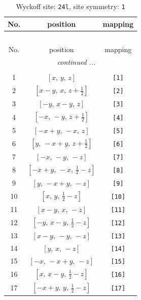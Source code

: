 \documentclass[fleqn,8pt]{jsarticle}
\begin{document}
\begin{longtable}{ccc}
\caption{Wyckoff site: {\tt 24l}, site symmetry: {\tt 1}}
 \\
 \hline \hline
No. & position & mapping \\ \hline \endfirsthead

\multicolumn{2}{l}{\tablename\ \thetable{}} \\
 \hline \hline
No. & position & mapping \\ \hline \endhead

 \hline \hline
\multicolumn{2}{r}{\footnotesize\it continued ...} \\ \endfoot

 \hline \hline
\multicolumn{2}{r}{} \\ \endlastfoot

1 & $\left[ x,\, y,\, z \right]$ & {\tt [1]} \\ \hline
2 & $\left[ x - y,\, x,\, z + \frac{1}{2} \right]$ & {\tt [2]} \\ \hline
3 & $\left[ - y,\, x - y,\, z \right]$ & {\tt [3]} \\ \hline
4 & $\left[ - x,\, - y,\, z + \frac{1}{2} \right]$ & {\tt [4]} \\ \hline
5 & $\left[ - x + y,\, - x,\, z \right]$ & {\tt [5]} \\ \hline
6 & $\left[ y,\, - x + y,\, z + \frac{1}{2} \right]$ & {\tt [6]} \\ \hline
7 & $\left[ - x,\, - y,\, - z \right]$ & {\tt [7]} \\ \hline
8 & $\left[ - x + y,\, - x,\, \frac{1}{2} - z \right]$ & {\tt [8]} \\ \hline
9 & $\left[ y,\, - x + y,\, - z \right]$ & {\tt [9]} \\ \hline
10 & $\left[ x,\, y,\, \frac{1}{2} - z \right]$ & {\tt [10]} \\ \hline
11 & $\left[ x - y,\, x,\, - z \right]$ & {\tt [11]} \\ \hline
12 & $\left[ - y,\, x - y,\, \frac{1}{2} - z \right]$ & {\tt [12]} \\ \hline
13 & $\left[ x - y,\, - y,\, - z \right]$ & {\tt [13]} \\ \hline
14 & $\left[ y,\, x,\, - z \right]$ & {\tt [14]} \\ \hline
15 & $\left[ - x,\, - x + y,\, - z \right]$ & {\tt [15]} \\ \hline
16 & $\left[ x,\, x - y,\, \frac{1}{2} - z \right]$ & {\tt [16]} \\ \hline
17 & $\left[ - x + y,\, y,\, \frac{1}{2} - z \right]$ & {\tt [17]} \\ \hline

\end{longtable}
\end{document}
